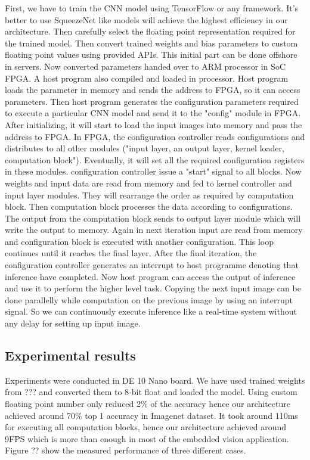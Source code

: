 \documentclass[conference]{IEEEtran}
\begin{document}
First, we have to train the CNN model using TensorFlow or any framework. It's better to use SqueezeNet like models will achieve the highest efficiency in our architecture. Then carefully select the floating point representation required for the trained model. Then convert trained weights and bias parameters to custom floating point values using provided APIs. This initial part can be done offshore in servers. Now converted parameters handed over to ARM processor in SoC FPGA. A host program also compiled and loaded in processor. Host program loads the parameter in memory and sends the address to FPGA, so it can access parameters. Then host program generates the configuration parameters required to execute a particular CNN model and send it to the "config" module in FPGA. After initializing, it will start to load the input images into memory and pass the address to FPGA. 
In FPGA, the configuration controller reads configurations and distributes to all other modules ("input layer, an output layer, kernel loader, computation block"). Eventually, it will set all the required configuration registers in these modules. configuration controller issue a "start" signal to all blocks. Now weights and input data are read from memory and fed to kernel controller and input layer modules. They will rearrange the order as required by computation block. Then computation block processes the data according to configurations. The output from the computation block sends to output layer module which will write the output to memory. Again in next iteration input are read from memory and configuration block is executed with another configuration. This loop continues until it reaches the final layer. After the final iteration, the configuration controller generates an interrupt to host programme denoting that inference have completed. Now host program can access the output of inference and use it to perform the higher level task. Copying the next input image can be done parallelly while computation on the previous image by using an interrupt signal. So we can continuously execute inference like a real-time system without any delay for setting up input image.


\subsection{Experimental results}\label{SCM}


Experiments were conducted in DE 10 Nano board. We have used trained weights from ??? and converted them to 8-bit float and loaded the model. Using custom floating point number only reduced 2\% of the accuracy hence our architecture achieved around 70\% top 1 accuracy in Imagenet dataset. It took around 110ms for executing all computation blocks, hence our architecture achieved around 9FPS which is more than enough in most of the embedded vision application.
Figure ?? show the measured performance of three different cases. 
\end{document}
